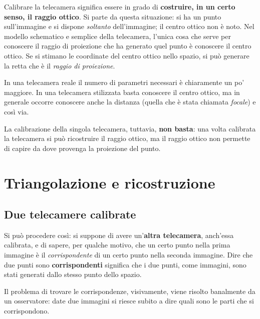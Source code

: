 Calibrare la telecamera significa essere in grado di \textbf{costruire, in un certo senso, il raggio ottico}. Si parte da questa situazione: si ha un punto sull'immagine e si dispone \emph{soltanto} dell'immagine; il centro ottico non è noto. Nel modello schematico e semplice della telecamera, l'unica cosa che serve per conoscere il raggio di proiezione che ha generato quel punto è conoscere il centro ottico. Se si stimano le coordinate del centro ottico nello spazio, si può generare la retta che è il \emph{raggio di proiezione}.

In una telecamera reale il numero di parametri necessari è chiaramente un po' maggiore. In una telecamera stilizzata basta conoscere il centro ottico, ma in generale occorre conoscere anche la distanza (quella che è stata chiamata \emph{focale}) e così via.

La calibrazione della singola telecamera, tuttavia, \textbf{non basta}: una volta calibrata la telecamera si può ricostruire il raggio ottico, ma il raggio ottico non permette di capire da dove provenga la proiezione del punto.

\section{Triangolazione e ricostruzione}

\subsection{Due telecamere calibrate}

Si può procedere così: si suppone di avere un'\textbf{altra telecamera}, anch'essa calibrata, e di sapere, per qualche motivo, che un certo punto nella prima immagine è il \emph{corrispondente} di un certo punto nella seconda immagine. Dire che due punti sono \textbf{corrispondenti} significa che i due punti, come immagini, sono stati generati dallo stesso punto dello spazio.

Il problema di trovare le corrispondenze, visivamente, viene risolto banalmente da un osservatore: date due immagini si riesce subito a dire quali sono le parti che si corrispondono.

\begin{center}
\end{center}

